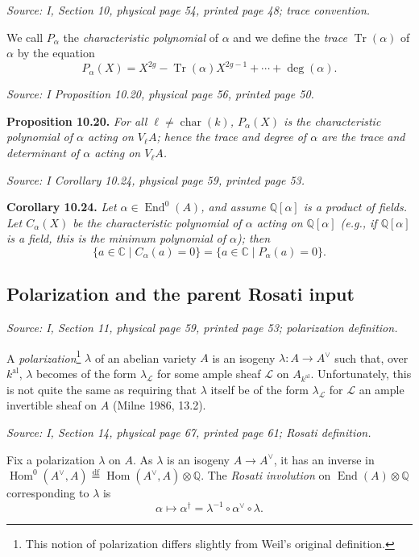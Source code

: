 \documentclass[11pt]{article}
\DeclareMathOperator{\AVEnd}{End}
\DeclareMathOperator{\AVHom}{Hom}
\DeclareMathOperator{\AVTr}{Tr}
\newcommand{\AVQ}{\mathbb{Q}}
\newcommand{\AVC}{\mathbb{C}}
\newcommand{\AVsrc}[1]{\par\smallskip\noindent\textit{Source: #1.}\par\smallskip}
\begin{document}
\AVsrc{I, Section 10, physical page 54, printed page 48; trace convention}
We call $P_\alpha$ the \emph{characteristic polynomial} of $\alpha$ and
we define the \emph{trace} $\AVTr(\alpha)$ of $\alpha$ by the equation
\[
P_\alpha(X)=X^{2g}-\AVTr(\alpha)X^{2g-1}+\cdots+\deg(\alpha).
\]

\AVsrc{I Proposition 10.20, physical page 56, printed page 50}
\noindent\textbf{Proposition 10.20.}
\emph{For all $\ell\ne\operatorname{char}(k)$, $P_\alpha(X)$ is the
characteristic polynomial of $\alpha$ acting on $V_\ell A$; hence the trace
and degree of $\alpha$ are the trace and determinant of $\alpha$ acting
on $V_\ell A$.}

\AVsrc{I Corollary 10.24, physical page 59, printed page 53}
\noindent\textbf{Corollary 10.24.}
\emph{Let $\alpha\in\AVEnd^0(A)$, and assume $\AVQ[\alpha]$ is a
product of fields. Let $C_\alpha(X)$ be the characteristic polynomial of
$\alpha$ acting on $\AVQ[\alpha]$ (e.g., if $\AVQ[\alpha]$ is a field,
this is the minimum polynomial of $\alpha$); then}
\[
\{a\in\AVC\mid C_\alpha(a)=0\}
=\{a\in\AVC\mid P_\alpha(a)=0\}.
\]

\subsection*{Polarization and the parent Rosati input}
\AVsrc{I, Section 11, physical page 59, printed page 53; polarization definition}
A \emph{polarization}\footnote[15]{This notion of polarization differs
slightly from Weil's original definition.}
$\lambda$ of an abelian variety $A$ is an isogeny
$\lambda:A\to A^{\vee}$ such that, over $k^{\mathrm{al}}$, $\lambda$
becomes of the form $\lambda_{\mathcal L}$ for some ample sheaf
$\mathcal L$ on $A_{k^{\mathrm{al}}}$. Unfortunately, this is not quite
the same as requiring that $\lambda$ itself be of the form
$\lambda_{\mathcal L}$ for $\mathcal L$ an ample invertible sheaf on $A$
(Milne 1986, 13.2).

\AVsrc{I, Section 14, physical page 67, printed page 61; Rosati definition}
Fix a polarization $\lambda$ on $A$. As $\lambda$ is an isogeny
$A\to A^{\vee}$, it has an inverse in
$\AVHom^0(A^{\vee},A)\overset{\mathrm{df}}=
\AVHom(A^{\vee},A)\otimes\AVQ$.
The \emph{Rosati involution} on $\AVEnd(A)\otimes\AVQ$ corresponding
to $\lambda$ is
\[
\alpha\longmapsto\alpha^{\dagger}
=\lambda^{-1}\circ\alpha^{\vee}\circ\lambda.
\]
\end{document}
